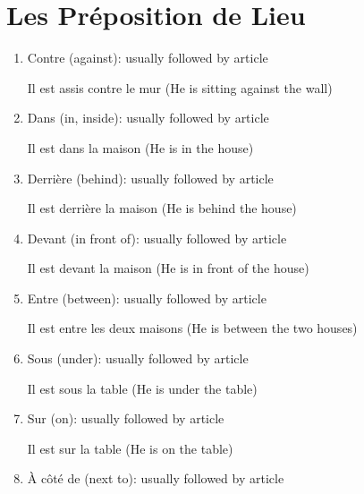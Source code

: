 \documentclass{book}
\begin{document}
    \section{Les Préposition de Lieu}
        \begin{enumerate}
            \item Contre (against): usually followed by article
                \begin{center}
                    Il est assis contre le mur (He is sitting against the wall)
                \end{center}
            \item Dans (in, inside): usually followed by article
                \begin{center}
                    Il est dans la maison (He is in the house)
                \end{center}
            \item Derrière (behind): usually followed by article
                \begin{center}
                    Il est derrière la maison (He is behind the house)
                \end{center}
            \item Devant (in front of): usually followed by article
                \begin{center}
                    Il est devant la maison (He is in front of the house)
                \end{center}
            \item Entre (between): usually followed by article
                \begin{center}
                    Il est entre les deux maisons (He is between the two houses)
                \end{center}
            \item Sous (under): usually followed by article
                \begin{center}
                    Il est sous la table (He is under the table)
                \end{center}
            \item Sur (on): usually followed by article
                \begin{center}
                    Il est sur la table (He is on the table)
                \end{center}
            \item À côté de (next to): usually followed by article
                \begin{center}

\end{center}
\end{enumerate}
\end{document}
